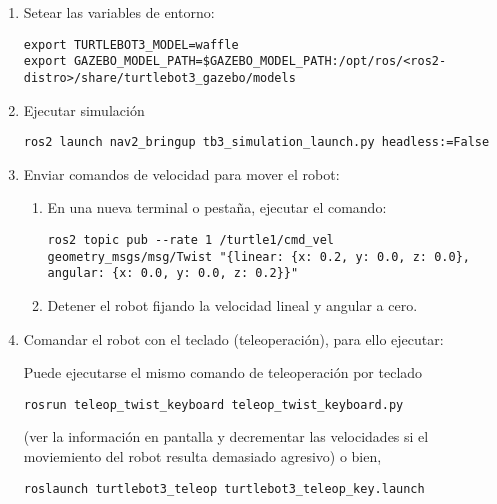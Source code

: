 \documentclass[tp]{lcc}
\begin{document}
\begin{enumerate}

\item Setear las variables de entorno:

\begin{lstlisting}[style=bash] 
export TURTLEBOT3_MODEL=waffle
export GAZEBO_MODEL_PATH=$GAZEBO_MODEL_PATH:/opt/ros/<ros2-distro>/share/turtlebot3_gazebo/models
\end{lstlisting}
	\item Ejecutar simulación

\begin{lstlisting}[style=bash] 
    ros2 launch nav2_bringup tb3_simulation_launch.py headless:=False
\end{lstlisting}


	\item Enviar comandos de velocidad para mover el robot:

	\begin{enumerate}
	\item En una nueva terminal o pestaña, ejecutar el comando:

\begin{lstlisting}[style=bash] 
ros2 topic pub --rate 1 /turtle1/cmd_vel geometry_msgs/msg/Twist "{linear: {x: 0.2, y: 0.0, z: 0.0}, angular: {x: 0.0, y: 0.0, z: 0.2}}"
\end{lstlisting}

\item Detener el robot fijando la velocidad lineal y angular a cero.
	\end{enumerate}

\item Comandar el robot con el teclado (teleoperación), para ello ejecutar:

Puede ejecutarse el mismo comando de teleoperación por teclado
\begin{lstlisting}[style=bash] 
rosrun teleop_twist_keyboard teleop_twist_keyboard.py
\end{lstlisting}
(ver la información en pantalla y decrementar las velocidades si el moviemiento del robot
resulta demasiado agresivo)
o bien,
\begin{lstlisting}[style=bash] 
roslaunch turtlebot3_teleop turtlebot3_teleop_key.launch
\end{lstlisting}

\end{enumerate}
\end{document}
